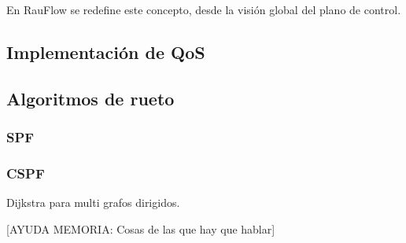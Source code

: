 En RauFlow se redefine este concepto, desde la visi\'on global del plano de control.

\subsection{Implementaci\'on de QoS}
\label{5.5.4}

\subsection{Algoritmos de rueto}

\subsubsection{SPF}

\subsubsection{CSPF}
Dijkstra para multi grafos dirigidos.

[AYUDA MEMORIA: Cosas de las que hay que hablar]

